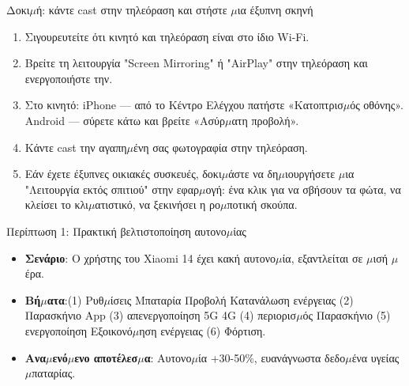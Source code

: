 \begin{tcbpractice}{Δοκι$\mu$ή: κάντε cast στην τηλεόραση και στήστε $\mu$ια έξυπνη σκηνή}
\begin{enumerate}
  \item Σιγουρευτείτε ότι κινητό και τηλεόραση είναι στο ίδιο Wi-Fi.
  \item Βρείτε τη λειτουργία "Screen Mirroring" ή "AirPlay" στην τηλεόραση και ενεργοποιήστε την.
  \item Στο κινητό: iPhone — από το Κέντρο Ελέγχου πατήστε «Κατοπτρισ$\mu$ός οθόνης». Android — σύρετε κάτω και βρείτε «Ασύρ$\mu$ατη προβολή».
  \item Κάντε cast την αγαπη$\mu$ένη σας φωτογραφία στην τηλεόραση.
  \item Εάν έχετε έξυπνες οικιακές συσκευές, δοκι$\mu$άστε να δη$\mu$ιουργήσετε $\mu$ια "Λειτουργία εκτός σπιτιού" στην εφαρ$\mu$ογή: ένα κλικ για να σβήσουν τα φώτα, να κλείσει το κλι$\mu$ατιστικό, να ξεκινήσει η ρο$\mu$ποτική σκούπα.
\end{enumerate}

\end{tcbpractice}

\begin{tcbinfo}{Περίπτωση 1: Πρακτική βελτιστοποίηση αυτονο$\mu$ίας}
\begin{itemize}
  \item \textbf{Σενάριο}: Ο χρήστης του Xiaomi 14 έχει κακή αυτονο$\mu$ία, εξαντλείται σε $\mu$ισή $\mu$έρα.
  \item \textbf{Βή$\mu$ατα}:(1) Ρυθ$\mu$ίσεις Μπαταρία Προβολή Κατανάλωση ενέργειας (2) Παρασκήνιο App (3) απενεργοποίηση 5G 4G (4) περιορισ$\mu$ός Παρασκήνιο (5) ενεργοποίηση Εξοικονό$\mu$ηση ενέργειας (6) Φόρτιση.
  \item \textbf{Ανα$\mu$ενό$\mu$ενο αποτέλεσ$\mu$α}: Αυτονο$\mu$ία +30-50\%, ευανάγνωστα δεδο$\mu$ένα υγείας $\mu$παταρίας.
\end{itemize}

\end{tcbinfo}
